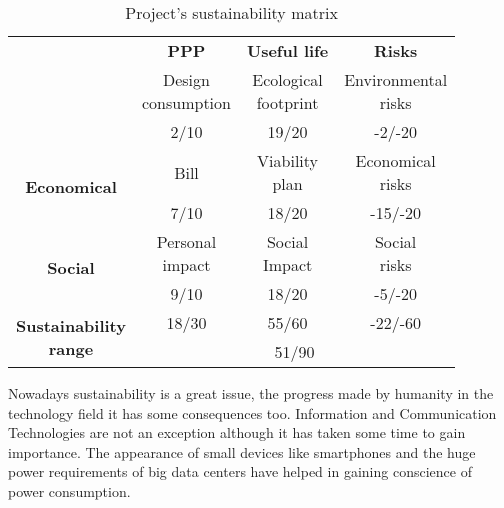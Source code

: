 \begin{table}[H]
  \centering
  \begin{tabular}{|c|c|c|c|}
    \cline{2-4}
    \multicolumn{1}{c|}{} & \textbf{PPP} & \textbf{Useful life} & \textbf{Risks} \\ 
    \hhline{-===}

    \multirow[c]{2}{*}{\textbf{Environmental}} & 
    \makecell{Design \\ consumption} & \makecell{Ecological \\ footprint} & 
    \makecell{Environmental \\ risks} \\ \cline{2-4}
    & 2/10 & 19/20 & -2/-20 \\ \hline
    
    \multirow{2}{*}{\textbf{Economical}} & 
    Bill & \makecell{Viability \\ plan} & \makecell{Economical \\ risks} \\ \cline{2-4}
    & 7/10 & 18/20 & -15/-20 \\ \hline

    \multirow{2}{*}{\textbf{Social}} &
    \makecell{Personal \\ impact} & \makecell{Social \\ Impact} & 
    \makecell{Social \\ risks} \\ \cline{2-4} 
    & 9/10 & 18/20 & -5/-20 \\ \hline

    \hline\hline
    \multirow{2}{*}{\parbox[c]{3cm}{\centering\textbf{Sustainability \\ range}}} &
    18/30 & 55/60 & -22/-60 \\ \cline{2-4}
    & \multicolumn{3}{c|}{51/90} \\ \hline

  \end{tabular}
  \caption{Project's sustainability matrix \label{tab:sustainability}}
\end{table}


Nowadays sustainability is a great issue, the progress made by humanity in the technology
field it has some consequences too. Information and Communication Technologies are not 
an exception although it has taken some time to gain importance. The appearance of 
small devices like smartphones and the huge power requirements of big data centers have 
helped in gaining conscience of power consumption. 

